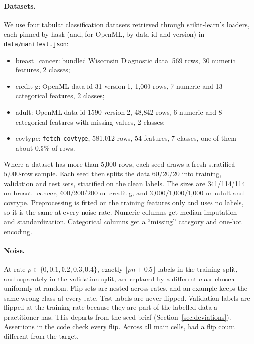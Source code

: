 \documentclass[11pt]{article}
\newcommand{\ds}[1]{\textsf{#1}}
\newcommand{\bc}{\ds{breast\_cancer}}
\newcommand{\cg}{\ds{credit-g}}
\newcommand{\ad}{\ds{adult}}
\newcommand{\ct}{\ds{covtype}}
\begin{document}
\paragraph{Datasets.} We use four tabular classification datasets retrieved through
scikit-learn's loaders, each pinned by hash (and, for OpenML, by data id and version) in
\texttt{data/manifest.json}:
\begin{itemize}
  \item \bc{}: bundled Wisconsin Diagnostic data, 569 rows, 30 numeric features, 2 classes;
  \item \cg{}: OpenML data id 31 version 1, 1,000 rows, 7 numeric and 13 categorical
    features, 2 classes;
  \item \ad{}: OpenML data id 1590 version 2, 48,842 rows, 6 numeric and 8 categorical
    features with missing values, 2 classes;
  \item \ct{}: \texttt{fetch\_covtype}, 581,012 rows, 54 features, 7 classes, one of them
    about 0.5\% of rows.
\end{itemize}
Where a dataset has more than 5,000 rows, each seed draws a fresh stratified 5,000-row
sample. Each seed then splits the data 60/20/20 into training, validation and test sets,
stratified on the clean labels. The sizes are 341/114/114 on \bc, 600/200/200 on \cg, and
3,000/1,000/1,000 on \ad{} and \ct. Preprocessing is fitted on the training features only
and uses no labels, so it is the same at every noise rate. Numeric columns get median
imputation and standardization. Categorical columns get a ``missing'' category and one-hot
encoding.

\paragraph{Noise.} At rate $\rho \in \{0, 0.1, 0.2, 0.3, 0.4\}$, exactly
$\lfloor \rho n + 0.5 \rfloor$ labels in the training split, and separately in the
validation split, are replaced by a different class chosen uniformly at random. Flip sets
are nested across rates, and an example keeps the same wrong class at every rate. Test labels
are never flipped. Validation labels are flipped at the training rate because they are part
of the labelled data a practitioner has. This departs from the seed brief
(Section~\ref{sec:deviations}). Assertions in the code check every flip. Across all
\NCells{} main cells, \NFlipFail{} had a flip count different from the target.
\end{document}
